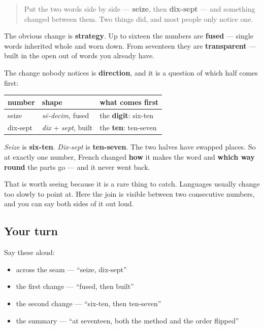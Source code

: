 \label{lesson:FR-C12-seam}



\begin{quote}
Put the two words side by side — \textbf{seize}, then \textbf{dix-sept} — and something changed between them. Two things did, and most people only notice one.
\end{quote}

\begin{grammarlens}[title={Grammar Lens: strategy and direction, both at once}]
The obvious change is \textbf{strategy}. Up to sixteen the numbers are \textbf{fused} — single words inherited whole and worn down. From seventeen they are \textbf{transparent} — built in the open out of words you already have.

The change nobody notices is \textbf{direction}, and it is a question of which half comes first:

\noindent
\begin{tabularx}{\linewidth}{@{}>{\raggedright\arraybackslash}X>{\raggedright\arraybackslash}X>{\raggedright\arraybackslash}X@{}}
\toprule
\textbf{number} & \textbf{shape} & \textbf{what comes first} \\
\midrule
seize & \emph{sē-decim}, fused & the \textbf{digit}: six-ten \\
dix-sept & \emph{dix} + \emph{sept}, built & the \textbf{ten}: ten-seven \\
\bottomrule
\end{tabularx}

\emph{Seize} is \textbf{six-ten}. \emph{Dix-sept} is \textbf{ten-seven}. The two halves have swapped places. So at exactly one number, French changed \textbf{how} it makes the word and \textbf{which way round} the parts go — and it never went back.

That is worth seeing because it is a rare thing to catch. Languages usually change too slowly to point at. Here the join is visible between two consecutive numbers, and you can say both sides of it out loud.
\end{grammarlens}

\subsection*{Your turn}
Say these aloud:

\begin{itemize}
\raggedright
  \item across the seam — \textquotedblleft{}seize, dix-sept\textquotedblright{}
  \item the first change — \textquotedblleft{}fused, then built\textquotedblright{}
  \item the second change — \textquotedblleft{}six-ten, then ten-seven\textquotedblright{}
  \item the summary — \textquotedblleft{}at seventeen, both the method and the order flipped\textquotedblright{}
\end{itemize}

